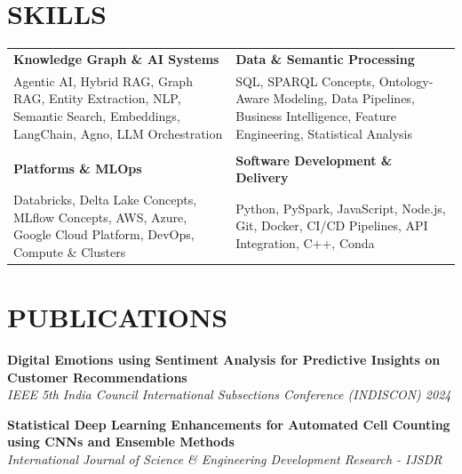 \documentclass[a4paper,11pt]{article}
\newcommand{\safehref}[2]{#2}
\let\href\safehref
\newcommand{\extlink}{\raisebox{0.2ex}{\scriptsize\faExternalLink*}}
\begin{document}
\section*{SKILLS}
\setlength{\tabcolsep}{10pt}
\renewcommand{\arraystretch}{1.0}
\begin{tabularx}{\textwidth}{@{}>{\RaggedRight\arraybackslash}X >{\RaggedRight\arraybackslash}X@{}}
  \textbf{Knowledge Graph \& AI Systems} & \textbf{Data \& Semantic Processing} \\
  Agentic AI, Hybrid RAG, Graph RAG, Entity Extraction, NLP, Semantic Search, Embeddings, LangChain, Agno, LLM Orchestration &
  SQL, SPARQL Concepts, Ontology-Aware Modeling, Data Pipelines, Business Intelligence, Feature Engineering, Statistical Analysis \\
  \\[-3pt]
  \textbf{Platforms \& MLOps} & \textbf{Software Development \& Delivery} \\
  Databricks, Delta Lake Concepts, MLflow Concepts, AWS, Azure, Google Cloud Platform, DevOps, Compute \& Clusters &
  Python, PySpark, JavaScript, Node.js, Git, Docker, CI/CD Pipelines, API Integration, C++, Conda \\
\end{tabularx}

\section*{PUBLICATIONS}
\sloppy
\noindent\textbf{\href{https://example.com}{Digital Emotions using Sentiment Analysis for Predictive Insights on Customer Recommendations\ \extlink}}\\
\textit{IEEE 5th India Council International Subsections Conference (INDISCON) 2024}

\vspace{0.2cm}
\noindent\textbf{\href{https://example.com}{Statistical Deep Learning Enhancements for Automated Cell Counting using CNNs and Ensemble Methods\ \extlink}}\\
\textit{International Journal of Science \& Engineering Development Research - IJSDR}
\fussy
\end{document}
